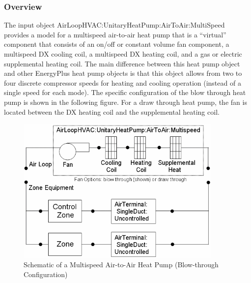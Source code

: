 \subsubsection{Overview}\label{overview-4}

The input object AirLoopHVAC:UnitaryHeatPump:AirToAir:MultiSpeed provides a model for a multispeed air-to-air heat pump that is a ``virtual'' component that consists of an on/off or constant volume fan component, a multispeed DX cooling coil, a multispeed DX heating coil, and a gas or electric supplemental heating coil. The main difference between this heat pump object and other EnergyPlus heat pump objects is that this object allows from two to four discrete compressor speeds for heating and cooling operation (instead of a single speed for each mode). The specific configuration of the blow through heat pump is shown in the following figure. For a draw through heat pump, the fan is located between the DX heating coil and the supplemental heating coil.

\begin{figure}[hbtp] %
\centering
\includegraphics[width=0.9\textwidth, height=0.9\textheight, keepaspectratio=true]{media/image5147.png}
\caption{Schematic of a Multispeed Air-to-Air Heat Pump (Blow-through Configuration) \protect \label{fig:schematic-of-a-multispeed-air-to-air-heat}}
\end{figure}

